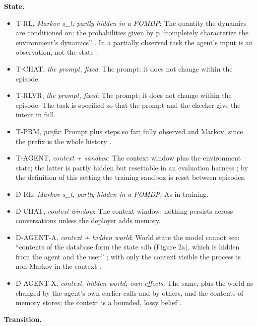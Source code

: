 \documentclass{article}
\providecommand{\tightlist}{\setlength{\itemsep}{0pt}\setlength{\parskip}{0pt}}
\begin{document}
\textbf{State.}

\begin{itemize}
\tightlist
\item
  T-RL, \emph{Markov s\_t; partly hidden in a POMDP}: The quantity the dynamics are conditioned on; the probabilities given by p ``completely characterize the environment's dynamics'' \citep{sutton2018}. In a partially observed task the agent's input is an observation, not the state \citep{kaelbling1998}.
\item
  T-CHAT, \emph{the prompt, fixed}: The prompt; it does not change within the episode.
\item
  T-RLVR, \emph{the prompt, fixed}: The prompt; it does not change within the episode. The task is specified so that the prompt and the checker give the intent in full.
\item
  T-PRM, \emph{prefix}: Prompt plus steps so far; fully observed and Markov, since the prefix is the whole history \citep{feng2023}.
\item
  T-AGENT, \emph{context + sandbox}: The context window plus the environment state; the latter is partly hidden \citep{yao2024} but resettable in an evaluation harness \citep{jimenez2024}; by the definition of this setting the training sandbox is reset between episodes.
\item
  D-RL, \emph{Markov s\_t; partly hidden in a POMDP}: As in training.
\item
  D-CHAT, \emph{context window}: The context window; nothing persists across conversations unless the deployer adds memory.
\item
  D-AGENT-A, \emph{context + hidden world}: World state the model cannot see: ``contents of the database form the state sdb (Figure 2a), which is hidden from the agent and the user'' \citep{yao2024}; with only the context visible the process is non-Markov in the context \citep{kaelbling1998}.
\item
  D-AGENT-X, \emph{context, hidden world, own effects}: The same, plus the world as changed by the agent's own earlier calls and by others, and the contents of memory stores; the context is a bounded, lossy belief \citep{kaelbling1998, chen2024}.
\end{itemize}

\textbf{Transition.}
\end{document}
